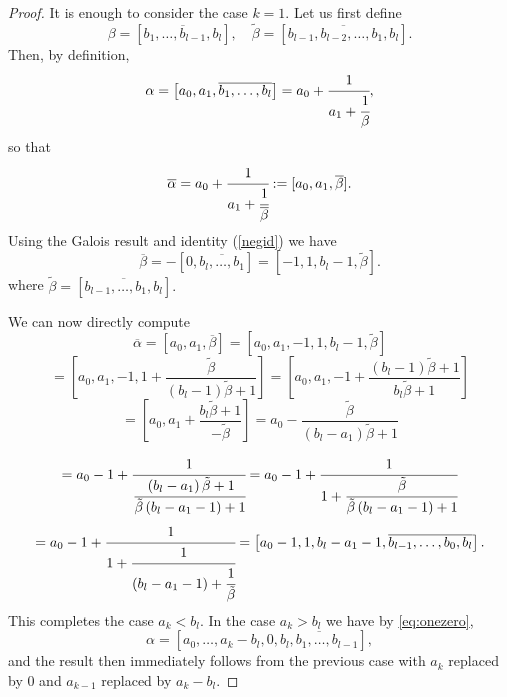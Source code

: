 \documentclass[11pt,reqno]{amsart}
\begin{document}
\begin{proof} It is enough to consider the case $k=1$. Let us first define
\begin{equation*}
\beta = \left[\overline{b_1, \ldots, b_{l-1}, b_l}\right], \quad
\tilde{\beta} = \left[\overline{b_{l-1}, b_{l-2}, \ldots, b_1, b_l}\right].
\end{equation*}
Then, by definition,
\begin{equation*}
\alpha = \left[a_0, a_1, \overline{b_1, \ldots, b_l}\right] = a_0 + \cfrac{1}{a_1 
          + \cfrac{1}{\beta} },
\end{equation*}
so that
\begin{equation*}
\overline{\alpha} = a_0 + \cfrac{1}{a_1 
          + \cfrac{1}{\overline{\beta}} }:=[a_0,a_1, \overline{\beta}].
\end{equation*}
Using the Galois result and identity  (\ref{negid}) we have
$$
\overline{\beta} = - \left[0, \overline{b_l, \ldots, b_1} \right] = \left[-1, 1, b_l - 1, \tilde\beta \right].
$$
where 
$\tilde\beta=[\overline{b_{l-1}, \ldots, b_1, b_l}].$

We can now directly compute
$$
\overline{\alpha} = [a_0,a_1, \overline{\beta}]=\left[a_0,a_1,-1, 1, b_l - 1, \tilde\beta \right]
$$
$$
= \left[a_0,a_1,-1, 1+ \frac{\tilde\beta}{\left(b_l - 1\right)\tilde{\beta} + 1}  \right]
= \left[a_0,a_1,-1+\frac{\left(b_l - 1\right)\tilde{\beta} + 1}{b_l \tilde{\beta} + 1}    \right]
$$
$$
=\left[a_0, a_1 
          + \frac{b_l \tilde{\beta} + 1}{-\tilde{\beta} }   \right]=a_0 - \frac{\tilde{\beta}}{\left(b_l - a_1\right)\tilde{\beta} + 1 } 
$$


$$
= a_0 - 1 + \cfrac{1}{ 
           \cfrac{\left(b_l - a_1\right)\tilde{\beta} + 1}{\tilde{\beta} \left(b_l - a_1 - 1 \right) + 1 } } \\
= a_0 - 1 + \cfrac{1}{1 
          + \cfrac{\tilde{\beta}}{\tilde{\beta} \left(b_l - a_1 - 1 \right) + 1 } }
          $$
          $$
= a_0 - 1 + \cfrac{1}{1 
          + \cfrac{1}{\left(b_l - a_1 - 1 \right)  
					+ \cfrac{1}{\tilde{\beta}} } } \\
= \left[ a_0 - 1 , 1, b_l - a_1 - 1, \overline{b_{l-1}, \ldots, b_0, b_l} \right].
$$
This completes the case $a_k<b_l.$ In the case $a_k>b_l$
we have  by \eqref{eq:onezero},
\begin{equation*}
\alpha = \left[a_0, \ldots, a_k - b_l, 0, \overline{b_l, b_1, \ldots, b_{l-1}}\right],
\end{equation*}
and the result then immediately follows from the previous case with $a_k$ replaced by $0$ and $a_{k-1}$ replaced by $a_k - b_l$.
\end{proof}
\end{document}
